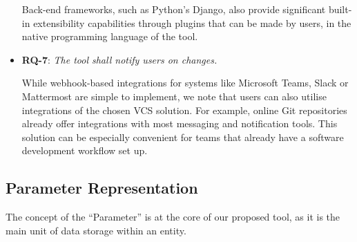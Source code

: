 \documentclass[]{iac}
\def\todo#1{}
\begin{document}
\begin{itemize}[itemsep=6pt]
    Back-end frameworks, such as Python's Django, also provide significant built-in extensibility capabilities through plugins that can be made by users, in the native programming language of the tool.

    \item \textbf{RQ-7}: \emph{The tool shall notify users on changes.}

    While webhook-based integrations for systems like Microsoft Teams, Slack or Mattermost are simple to implement, we note that users can also utilise integrations of the chosen \acs{VCS} solution. For example,
    online Git repositories already offer integrations with most messaging and notification tools. This solution can be especially convenient for teams that already have a software development workflow set up.



\end{itemize}





\subsection{Parameter Representation}
\label{sec:parameters}
The concept of the ``Parameter'' is at the core of our proposed tool, as it is the main unit of data storage within an entity.
\end{document}
